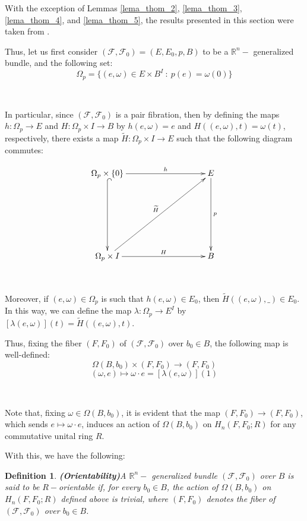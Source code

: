 \documentclass[12pt,oneside]{book}
\newtheorem{defi}   {Definition}[chapter]
\newcommand{\R}{\mathbb{R}}
\newcommand{\wt}{\widetilde}
\begin{document}
    With the exception of Lemmas \ref{lema_thom_2}, \ref{lema_thom_3}, \ref{lema_thom_4}, and \ref{lema_thom_5}, the results presented in 
    this section were taken from \cite{fadell_1}.

    Thus, let us first consider $(\mathcal{F},\mathcal{F}_{0})=(E,E_{0},p,B)$ to be a $\R^{n}-$ generalized bundle, 
    and the following set:
    $$ \Omega_{p}=\{ (e,\omega)\in E\times B^{I} \ : \ p(e)=\omega(0) \} $$

    \

    In particular, since $(\mathcal{F},\mathcal{F}_{0})$ is a pair fibration, then by defining the maps 
    $h:\Omega_{p}\to E$ and $H:\Omega_{p}\times I\to B$ by $h(e,\omega)=e$ and $H((e,\omega),t)=\omega(t)$, respectively, there exists a 
    map $\wt{H}:\Omega_{p}\times I\to E$ such that the following diagram commutes:

    $$ \xymatrix @C=0.5cm {
    	\Omega_{p}\times \{0\}\ar[rrrrr]^-{h} \ar@{^(->}[ddd] &&&&& E \ar[ddd]^-{p} \\
    	&&&&& \\		 
    	&&&&& \\				 
    	\Omega_{p}\times I \ar[rrrrr]^-{H} \ar[rrrrruuu]^-{\wt{H}} &&&&& B
    } $$

    \

    Moreover, if $(e,\omega)\in \Omega_{p}$ is such that $h(e,\omega)\in E_{0}$, then $\wt{H}((e,\omega),\_) \in E_{0}$. 
    In this way, we can define the map $\lambda:\Omega_{p}\to E^{I}$ by $\left[ \lambda(e,\omega) \right](t)=\wt{H}((e,\omega),t)$.

    Thus, fixing the fiber $(F,F_{0})$ of $(\mathcal{F},\mathcal{F}_{0})$ over $b_{0}\in B$, the following map is well-defined:
    $$ \Omega(B,b_{0})\times (F,F_{0}) \to (F,F_{0}) $$
    $$ (\omega,e)\longmapsto \omega\cdot e=\left[ \lambda(e,\omega) \right](1)  $$

    \

    Note that, fixing $\omega\in \Omega(B,b_{0})$, it is evident that the map $(F,F_{0})\to (F,F_{0})$, which sends $e\mapsto \omega\cdot e$, 
    induces an action of $\Omega(B,b_{0})$ on $H_{n}(F,F_{0};R)$ for any commutative unital ring $R$.

    With this, we have the following:

    \begin{defi}{\bf (Orientability)}\label{defi_orient}
    	A $\R^{n}-$ generalized bundle $(\mathcal{F},\mathcal{F}_{0})$ over $B$ is said to be 
        $R-$orientable if, for every $b_{0}\in B$, the action of $\Omega(B,b_{0})$ on $H_{n}(F,F_{0};R)$ 
        defined above is trivial, where $(F,F_{0})$ denotes the fiber of $(\mathcal{F},\mathcal{F}_{0})$ over $b_{0}\in B$.
    \end{defi}
\end{document}
